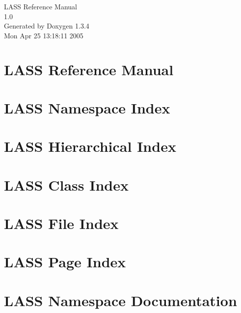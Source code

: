 \documentclass[letterpaper]{book}
\begin{document}
\begin{titlepage}
\vspace*{7cm}
\begin{center}
{\Large LASS Reference Manual\\[1ex]\large 1.0 }\\
\vspace*{1cm}
{\large Generated by Doxygen 1.3.4}\\
\vspace*{0.5cm}
{\small Mon Apr 25 13:18:11 2005}\\
\end{center}
\end{titlepage}
\clearemptydoublepage
{}
\tableofcontents
\clearemptydoublepage
{}
\chapter{LASS Reference Manual }
\label{index}\hypertarget{index}{}
\chapter{LASS Namespace Index}

\chapter{LASS Hierarchical Index}

\chapter{LASS Class Index}

\chapter{LASS File Index}

\chapter{LASS Page Index}

\chapter{LASS Namespace Documentation}

\end{document}
